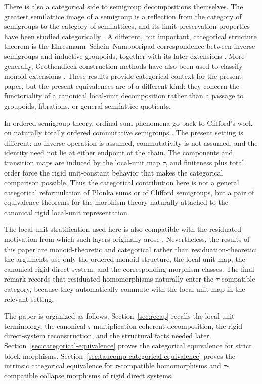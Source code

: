 \documentclass[pdflatex,sn-mathphys-num]{sn-jnl}
\theoremstyle{thmstyleone}%
\theoremstyle{thmstyletwo}%
\theoremstyle{thmstylethree}%
\begin{document}
There is also a categorical side to semigroup decompositions themselves.
The greatest semilattice image of a semigroup is a reflection from the category of semigroups to the category of semilattices, and its limit-preservation properties have been studied categorically \cite{JanelidzeLaanMarki2008}.
A different, but important, categorical structure theorem is the Ehresmann--Schein--Nambooripad correspondence between inverse semigroups and inductive groupoids, together with its later extensions \cite{Hollings2012,DeWolfPronk2018}.
More generally, Grothendieck-construction methods have also been used to classify monoid extensions \cite{Manuell2022}.
These results provide categorical context for the present paper, but the present equivalences are of a different kind: they concern the functoriality of a canonical local-unit decomposition rather than a passage to groupoids, fibrations, or general semilattice quotients.

In ordered semigroup theory, ordinal-sum phenomena go back to Clifford's work on naturally totally ordered commutative semigroups \cite{Clifford1954,Clifford1958}.
The present setting is different: no inverse operation is assumed, commutativity is not assumed, and the identity need not lie at either endpoint of the chain.
The components and transition maps are induced by the local-unit map \(\tau\), and finiteness plus total order force the rigid unit-constant behavior that makes the categorical comparison possible.
Thus the categorical contribution here is not a general categorical reformulation of P\l{}onka sums or of Clifford semigroups, but a pair of equivalence theorems for the morphism theory naturally attached to the canonical rigid local-unit representation.

The local-unit stratification used here is also compatible with the residuated motivation from which such layers originally arose \cite{Jenei2022GroupRepr}.
Nevertheless, the results of this paper are monoid-theoretic and categorical rather than residuation-theoretic: the arguments use only the ordered-monoid structure, the local-unit map, the canonical rigid direct system, and the corresponding morphism classes.
The final remark records that residuated homomorphisms naturally enter the \(\tau\)-compatible category, because they automatically commute with the local-unit map in the relevant setting.

The paper is organized as follows.
Section~\ref{sec:recap} recalls the local-unit terminology, the canonical \(\tau\)-multiplication-coherent decomposition, the rigid direct-system reconstruction, and the structural facts needed later.
Section~\ref{sec:categorical-equivalence} proves the categorical equivalence for strict block morphisms.
Section~\ref{sec:taucomp-categorical-equivalence} proves the intrinsic categorical equivalence for \(\tau\)-compatible homomorphisms and \(\tau\)-compatible collapse morphisms of rigid direct systems.
\end{document}
